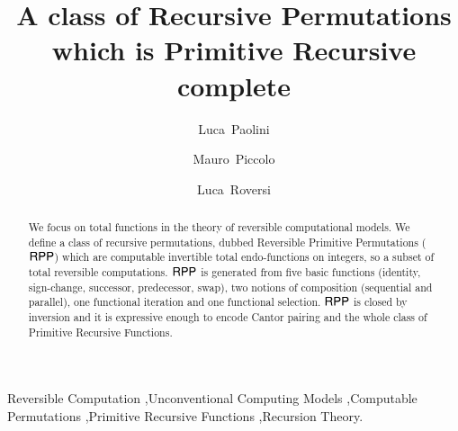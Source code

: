 \documentclass{elsarticle}
\begin{document}
\begin{frontmatter}



\title{A class of Recursive Permutations
\\ which is Primitive Recursive complete}

\author[unito]{Luca~Paolini}
\author[unito]{Mauro~Piccolo}
\author[unito]{Luca~Roversi}

\address[unito]{Dipartimento di Informatica -- Universit\`a di Torino}

\begin{abstract}

We focus on total functions in the theory of reversible computational models.
We define a class of recursive permutations, dubbed
Reversible Primitive Permutations ($ \mathsf{RPP} $) which are
computable invertible total endo-functions on integers, 
so a subset of total reversible computations.
$ \mathsf{RPP} $ is generated from five basic functions (identity, 
sign-change, successor, predecessor, swap),
two notions of composition (sequential and parallel), one functional iteration 
and one functional selection.
$ \mathsf{RPP} $ is closed by inversion and it is expressive enough to encode Cantor pairing and the whole 
class of Primitive Recursive Functions.
\end{abstract}

\begin{keyword}
Reversible Computation \sep  Unconventional Computing Models \sep Computable Permutations 
\sep Primitive Recursive Functions \sep Recursion Theory.
\end{keyword}
\end{frontmatter}
\end{document}

